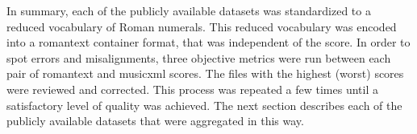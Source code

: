 
In summary, each of the publicly available datasets was
standardized to a reduced vocabulary of Roman numerals. This
reduced vocabulary was encoded into a \gls{romantext}
container format, that was independent of the score. In
order to spot errors and misalignments, three objective
metrics were run between each pair of \gls{romantext} and
\gls{musicxml} scores. The files with the highest (worst)
scores were reviewed and corrected. This process was
repeated a few times until a satisfactory level of quality
was achieved. The next section describes each of the
publicly available datasets that were aggregated in this
way.

